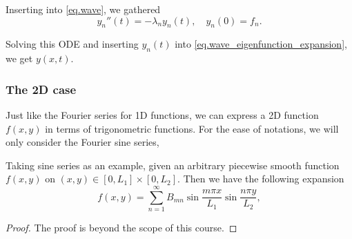 Inserting into \eqref{eq.wave}, we gathered
\[
    y_n''(t) = -\lambda_n y_n(t),\quad y_n(0) = f_n.
\]

Solving this ODE and inserting $y_n(t)$ into \eqref{eq.wave_eigenfunction_expansion}, we get $y(x, t)$.


\subsubsection{The 2D case}
Just like the Fourier series for 1D functions, we can express a 2D function $f(x, y)$ in terms of trigonometric functions. For the ease of notations, we will only consider the Fourier sine series, 
\begin{theorem} Taking sine series as an example, given an arbitrary piecewise smooth function $f(x, y)$ on $(x, y)\in [0, L_1]\times [0, L_2]$. Then we have the following expansion
\begin{equation}\label{eq.Fourier_2D}
    f(x, y) =\sum_{n=1}^\infty B_{mn} \sin \frac{m \pi x}{L_1} \sin \frac{n \pi y}{L_2},
\end{equation}
\end{theorem}
\begin{proof}
    The proof is beyond the scope of this course. 
\end{proof}

